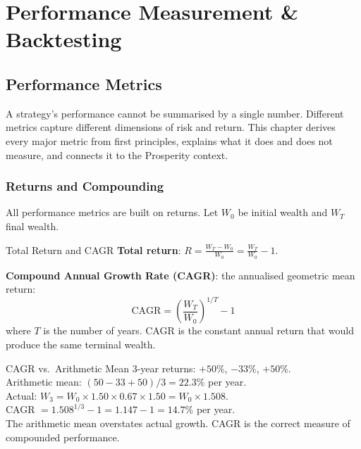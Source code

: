 \documentclass[12pt,a4paper,openany]{report}
\theoremstyle{definition}
\begin{document}

%
%
\part{Performance Measurement \& Backtesting}

\chapter{Performance Metrics}

A strategy's performance cannot be summarised by a single number. Different metrics capture different dimensions of risk and return. This chapter derives every major metric from first principles, explains what it does and does not measure, and connects it to the Prosperity context.

\section{Returns and Compounding}

All performance metrics are built on returns. Let $W_0$ be initial wealth and $W_T$ final wealth.

\begin{definitionbox}{Total Return and CAGR}
\textbf{Total return}: $R = \frac{W_T - W_0}{W_0} = \frac{W_T}{W_0} - 1$.

\textbf{Compound Annual Growth Rate (CAGR)}: the annualised geometric mean return:
\[
  \text{CAGR} = \left(\frac{W_T}{W_0}\right)^{1/T} - 1
\]
where $T$ is the number of years. CAGR is the constant annual return that would produce the same terminal wealth.
\end{definitionbox}

\begin{examplebox}{CAGR vs.\ Arithmetic Mean}
3-year returns: $+50\%$, $-33\%$, $+50\%$. \\
Arithmetic mean: $(50 - 33 + 50)/3 = 22.3\%$ per year. \\
Actual: $W_3 = W_0 \times 1.50 \times 0.67 \times 1.50 = W_0 \times 1.508$. \\
CAGR $= 1.508^{1/3} - 1 = 1.147 - 1 = 14.7\%$ per year. \\
The arithmetic mean overstates actual growth. CAGR is the correct measure of compounded performance.
\end{examplebox}
\end{document}

